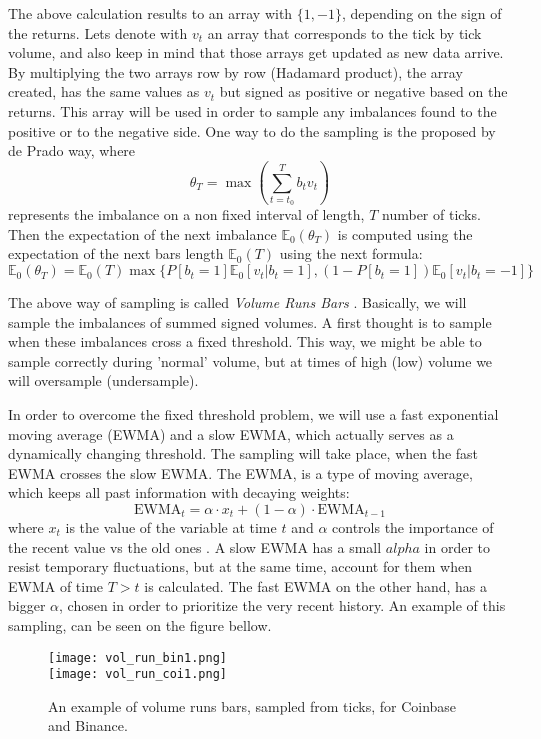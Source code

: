 The above calculation results to an array with \(\{1,-1\}\), depending on the sign of the returns. Lets denote with \( v_t \) an array that corresponds to the tick by tick volume, and also keep in mind that those arrays get updated as new data arrive. By multiplying the two arrays row by row (Hadamard product), the array created, has the same values as \( v_t \) but signed as positive or negative based on the returns. This array will be used in order to sample any imbalances found to the positive or to the negative side. One way to do the sampling is the proposed by de Prado way, where 
\[ \theta_T = \max(\sum_{t = t_0}^{T} b_tv_t) \]
represents the imbalance on a non fixed interval of length, \(T\) number of ticks. Then the expectation of the next imbalance \( \mathbb{E}_0(\theta_T) \) is computed using the expectation of the next bars length \( \mathbb{E}_0(T) \) using the next formula:
\[ \mathbb{E}_0(\theta_T) = \mathbb{E}_0(T) \max\{P[b_t=1]\mathbb{E}_0[v_t|b_t=1], (1-P[b_t=1])\mathbb{E}_0[v_t|b_t=-1]\} \]

The above way of sampling is called \textit{Volume Runs Bars} \cite{marcos}. Basically, we will sample the imbalances of summed signed volumes. A first thought is to sample when these imbalances cross a fixed threshold. This way, we might be able to sample correctly during 'normal' volume, but at times of high (low) volume we will oversample (undersample). 

In order to overcome the fixed threshold problem, we will use a fast exponential moving average (EWMA) and a slow EWMA, which actually serves as a dynamically changing threshold. The sampling will take place, when the fast EWMA crosses the slow EWMA. The EWMA, is a type of moving average, which keeps all past information with decaying weights:
\[ \text{EWMA}_t = \alpha \cdot x_t + (1 - \alpha) \cdot \text{EWMA}_{t-1} \]
 where \(x_t\) is the value of the variable at time \(t\) and \(\alpha\) controls the importance of the recent value vs the old ones \cite{prod}. A slow EWMA has a small \(alpha\) in order to resist temporary fluctuations, but at the same time, account for them when EWMA of time \(T > t\) is calculated. The fast EWMA on the other hand, has a bigger \(\alpha\), chosen in order to prioritize the  very recent history. An example of this sampling, can be seen on the figure bellow.


\begin{figure}[H]
	\centering
    \texttt{[image: vol\_run\_bin1.png]} \\
    \texttt{[image: vol\_run\_coi1.png]}
	\caption{An example of volume runs bars, sampled from ticks, for Coinbase and Binance.}
    \label{fig:vol_run}
\end{figure}

